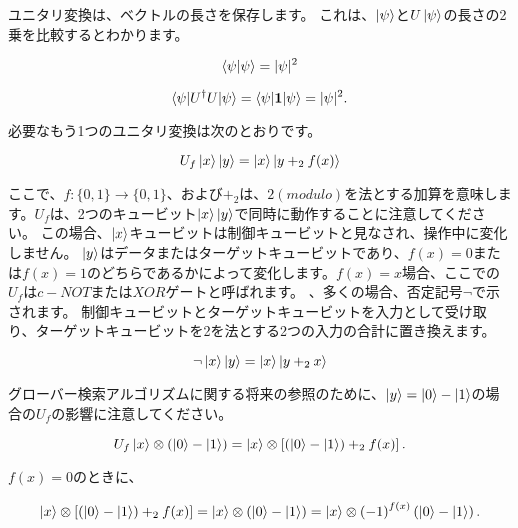 ユニタリ変換は、ベクトルの長さを保存します。 これは、$\ket{\psi}$と$U\ket{\psi}$の長さの2乗を比較するとわかります。

\begin{equation}
\label{66}
\braket{\psi | \psi} = | \psi |^2
\end{equation}

\begin{equation}
\label{67}
\braket{\psi | U^{\dag} U | \psi} = \braket{\psi | \mathbf{1} | \psi}  = | \psi |^2 .
\end{equation}

必要なもう1つのユニタリ変換は次のとおりです。

\begin{equation}
\label{68}
U_f \ket{x} \ket{y}
= \ket{x} \ket{y +_2 f(x) }
\end{equation}

ここで、$ f: \{0,1 \} \to \{ 0, 1 \}$、および$+_2$は、$2(modulo)$を法とする加算を意味します。$U_f$は、2つのキュービット$\ket{x} \ket{y}$で同時に動作することに注意してください。 この場合、$\ket{x}$キュービットは制御キュービットと見なされ、操作中に変化しません。 $\ket{y}$はデータまたはターゲットキュービットであり、$f(x) = 0$または$f(x) = 1$のどちらであるかによって変化します。$f(x) = x$場合、ここでの$U_f$は$c-NOT$または$XOR$ゲートと呼ばれます。 、多くの場合、否定記号$\lnot$で示されます。 制御キュービットとターゲットキュービットを入力として受け取り、ターゲットキュービットを2を法とする2つの入力の合計に置き換えます。

\begin{equation}
\label{69}
\lnot \ket{x} \ket{y}
= \ket{x} \ket{y +_2 x}
\end{equation}

グローバー検索アルゴリズムに関する将来の参照のために、$\ket{y} = \ket{0} - \ket{1}$の場合の$U_f$の影響に注意してください。


\begin{equation}
\label{70}
U_f \ket{x} \otimes \left( \ket{0} - \ket{1} \right)
= \ket{x} \otimes \left[ \left(  
\ket{0} - \ket{1} \right) 
+_2 f(x)
\right].
\end{equation}

$f(x) = 0 $のときに、

\begin{equation}
\label{71}
\ket{x} \otimes \left[ \left(  
\ket{0} - \ket{1} \right) 
+_2 f(x)
\right]
=
\ket{x} \otimes \left( \ket{0} - \ket{1} \right)
=
\ket{x} \otimes \left( -1 \right)^{f(x)} \left( \ket{0} - \ket{1} \right).
\end{equation}

